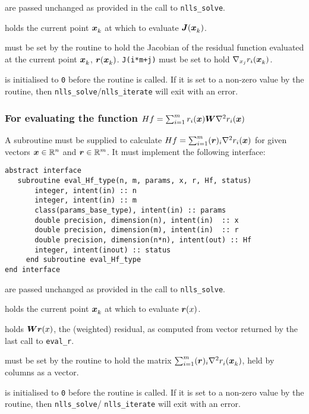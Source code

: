 \documentclass{spec}
\begin{document}
\begin{description}
    are passed unchanged as provided in the call to
      {\tt nlls\_solve}.

    holds the current point ${\bm x}_{k}^{}$ at which to evaluate
      ${\bm J}({\bm x}_{k}^{})$.

    must be set by the routine to hold the Jacobian of the residual
      function evaluated at the current point ${\bm x}_{k}^{}$, ${\bm r}({\bm x}_{k}^{})$.
      \texttt{J(i*m+j)} must be set to hold $\nabla_{x_j} r_i({\bm x}_{k}^{})$.

    is initialised to \texttt{0} before the routine is
      called. If it is set to a non-zero value by the routine, then
      {\tt nlls\_solve}/{\tt nlls\_iterate} will exit with an error.
\end{description}

\subsubsection{For evaluating the function $Hf = \sum_{i=1}^m r_i({\bm x}) {\bm W} \nabla^2 r_i({\bm x})$}
A subroutine must be supplied to calculate $Hf = \sum_{i=1}^m ({\bm r})_i \nabla^2 r_i({\bm x})$ for given vectors ${\bm x} \in \mathbb{R}^n$ and ${\bm r} \in \mathbb{R}^m$. It must implement the following interface:

\begin{verbatim}
abstract interface
   subroutine eval_Hf_type(n, m, params, x, r, Hf, status)
       integer, intent(in) :: n
       integer, intent(in) :: m
       class(params_base_type), intent(in) :: params
       double precision, dimension(n), intent(in)  :: x
       double precision, dimension(m), intent(in)  :: r
       double precision, dimension(n*n), intent(out) :: Hf
       integer, intent(inout) :: status
     end subroutine eval_Hf_type
end interface
\end{verbatim}

\begin{description}
    are passed unchanged as provided in the call to
      {\tt nlls\_solve}.

    holds the current point ${\bm x}_{k}^{}$ at which to evaluate ${\bm r}(x)$.

    holds ${\bm W}{\bm r}(x)$, the (weighted) residual, as computed from vector returned by the last call to \texttt{eval\_r}.

    must be set by the routine to hold the matrix
      $\sum_{i = 1}^m ({\bm r})_i \nabla^2r_{i}^{}({\bm x}_{k}^{})$, held
      by columns as a vector.

    is initialised to \texttt{0} before the routine is called.
      If it is set to a non-zero value by the routine, then {\tt nlls\_solve}/
      {\tt nlls\_iterate} will exit with an error.
\end{description}
\end{document}
